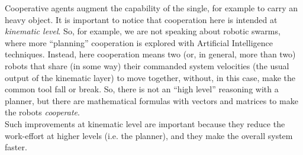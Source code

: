 Cooperative agents augment the capability of the single, for example to carry an heavy object. It is important to notice that cooperation here is intended at \textit{kinematic level}. So, for example, we are not speaking about robotic swarms, where more \enquote{planning} cooperation is explored with Artificial Intelligence techniques. Instead, here cooperation means two (or, in general, more than two) robots that share (in some way) their commanded system velocities (the usual output of the kinematic layer) to move together, without, in this case, make the common tool fall or break. So, there is not an \enquote{high level} reasoning with a planner, but there are mathematical formulas with vectors and matrices to make the robots \textit{cooperate}.\\
Such improvements at kinematic level are important because they reduce the work-effort at higher levels (i.e. the planner), and they make the overall system faster.\\

